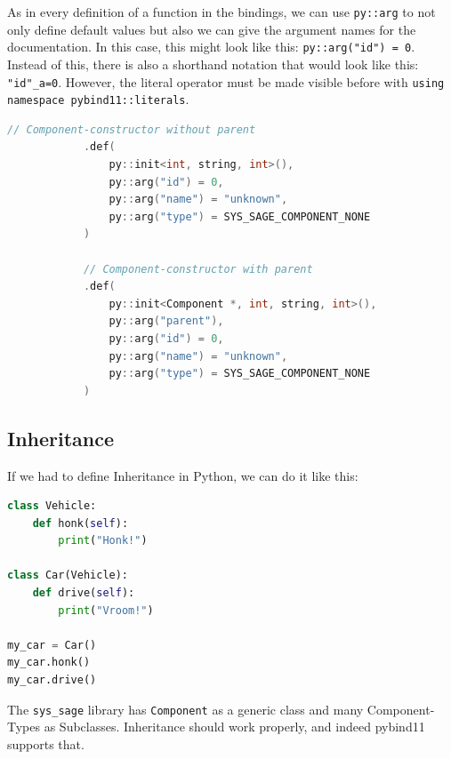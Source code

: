 As in every definition of a function in the bindings, we can use \verb|py::arg| to not only define default values but also we can give the argument names for the documentation. In this case, this might look like this: \verb|py::arg("id") = 0|. Instead of this, there is also a shorthand notation that would look like this: \verb|"id"_a=0|. However, the literal operator must be made visible before with \verb|using namespace pybind11::literals|. \cite[see Advanced Topics/Functions]{pybind11-docu}
\begin{lstlisting}[language=C++, xleftmargin=4em, frame = single]
            // Component-constructor without parent
            .def(
                py::init<int, string, int>(),
                py::arg("id") = 0,
                py::arg("name") = "unknown",
                py::arg("type") = SYS_SAGE_COMPONENT_NONE
            )
            
            // Component-constructor with parent
            .def(
                py::init<Component *, int, string, int>(),
                py::arg("parent"),
                py::arg("id") = 0,
                py::arg("name") = "unknown",
                py::arg("type") = SYS_SAGE_COMPONENT_NONE
            )
\end{lstlisting}
\subsection{Inheritance}

If we had to define Inheritance in Python, we can do it like this:
\newpage
\begin{lstlisting}[language=Python, xleftmargin=4em, frame = single]
class Vehicle:
    def honk(self):
        print("Honk!")

class Car(Vehicle):
    def drive(self):
        print("Vroom!")

my_car = Car()
my_car.honk()
my_car.drive()
\end{lstlisting}

The \verb|sys_sage| library has \verb|Component| as a generic class and many Component-Types as Subclasses. Inheritance should work properly, and indeed pybind11 supports that.

